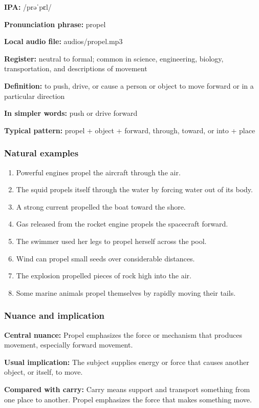 \documentclass[11pt]{article}
\begin{document}
\textbf{IPA:} /prəˈpɛl/

\textbf{Pronunciation phrase:} propel

\textbf{Local audio file:} audios/propel.mp3

\textbf{Register:} neutral to formal; common in science, engineering, biology, transportation, and descriptions of movement

\textbf{Definition:} to push, drive, or cause a person or object to move forward or in a particular direction

\textbf{In simpler words:} push or drive forward

\textbf{Typical pattern:} propel + object + forward, through, toward, or into + place

\subsubsection{Natural examples}
\begin{enumerate}
  \item Powerful engines propel the aircraft through the air.
  \item The squid propels itself through the water by forcing water out of its body.
  \item A strong current propelled the boat toward the shore.
  \item Gas released from the rocket engine propels the spacecraft forward.
  \item The swimmer used her legs to propel herself across the pool.
  \item Wind can propel small seeds over considerable distances.
  \item The explosion propelled pieces of rock high into the air.
  \item Some marine animals propel themselves by rapidly moving their tails.
\end{enumerate}

\subsubsection{Nuance and implication}
\textbf{Central nuance:} Propel emphasizes the force or mechanism that produces movement, especially forward movement.

\textbf{Usual implication:} The subject supplies energy or force that causes another object, or itself, to move.

\textbf{Compared with carry:} Carry means support and transport something from one place to another. Propel emphasizes the force that makes something move.
\end{document}
